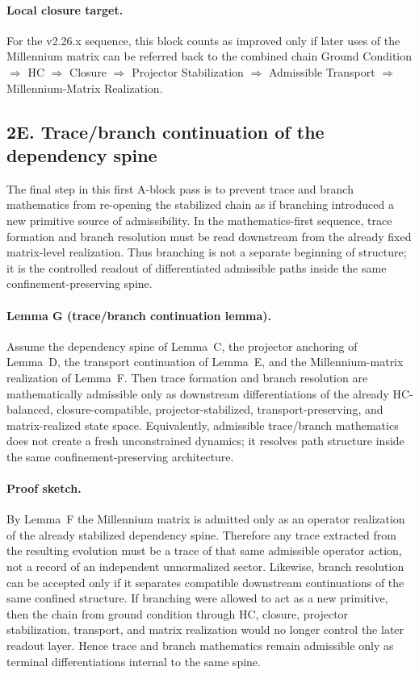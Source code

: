 \paragraph{Local closure target.}
For the v2.26.x sequence, this block counts as improved only if later uses of
the Millennium matrix can be referred back to the combined chain
Ground Condition $\Rightarrow$ HC $\Rightarrow$ Closure $\Rightarrow$
Projector Stabilization $\Rightarrow$ Admissible Transport $\Rightarrow$
Millennium-Matrix Realization.


\subsection*{2E. Trace/branch continuation of the dependency spine}
The final step in this first A-block pass is to prevent trace and branch
mathematics from re-opening the stabilized chain as if branching introduced a
new primitive source of admissibility. In the mathematics-first sequence, trace
formation and branch resolution must be read downstream from the already fixed
matrix-level realization. Thus branching is not a separate beginning of
structure; it is the controlled readout of differentiated admissible paths
inside the same confinement-preserving spine.

\paragraph{Lemma G (trace/branch continuation lemma).}
Assume the dependency spine of Lemma~C, the projector anchoring of Lemma~D, the
transport continuation of Lemma~E, and the Millennium-matrix realization of
Lemma~F. Then trace formation and branch resolution are mathematically
admissible only as downstream differentiations of the already HC-balanced,
closure-compatible, projector-stabilized, transport-preserving, and
matrix-realized state space. Equivalently, admissible trace/branch mathematics
does not create a fresh unconstrained dynamics; it resolves path structure
inside the same confinement-preserving architecture.

\paragraph{Proof sketch.}
By Lemma~F the Millennium matrix is admitted only as an operator realization of
the already stabilized dependency spine. Therefore any trace extracted from the
resulting evolution must be a trace of that same admissible operator action,
not a record of an independent unnormalized sector. Likewise, branch resolution
can be accepted only if it separates compatible downstream continuations of the
same confined structure. If branching were allowed to act as a new primitive,
then the chain from ground condition through HC, closure, projector
stabilization, transport, and matrix realization would no longer control the
later readout layer. Hence trace and branch mathematics remain admissible only
as terminal differentiations internal to the same spine.

